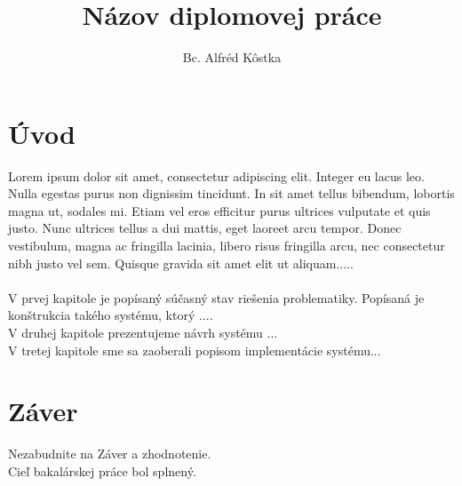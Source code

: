 \documentclass[12pt]{article}
\title{Názov diplomovej práce}
\author{Bc. Alfréd Kôstka}
\begin{document}








\tableofcontents
\pagebreak
\listoffigures
\pagebreak

\glsaddall %
\printglossary[title={Zoznam skratiek}]
\pagebreak

\section{Úvod}
Lorem ipsum dolor sit amet, consectetur adipiscing elit. Integer eu lacus leo. Nulla egestas purus non dignissim tincidunt. In sit amet tellus bibendum, lobortis magna ut, sodales mi. Etiam vel eros efficitur purus ultrices vulputate et quis justo. Nunc ultrices tellus a dui mattis, eget laoreet arcu tempor. Donec vestibulum, magna ac fringilla lacinia, libero risus fringilla arcu, nec consectetur nibh justo vel sem. Quisque gravida sit amet elit ut aliquam.....\\
\\V prvej kapitole je popísaný súčasný stav riešenia problematiky. Popísaná je konštrukcia takého systému, ktorý ....
\\V druhej kapitole prezentujeme návrh systému ...
\\V tretej kapitole sme sa zaoberali popisom implementácie systému...

 

\section{Záver}
Nezabudnite na Záver a zhodnotenie.\\  
Cieľ bakalárskej práce bol splnený.

\newpage

\nocite{*}



\end{document}
